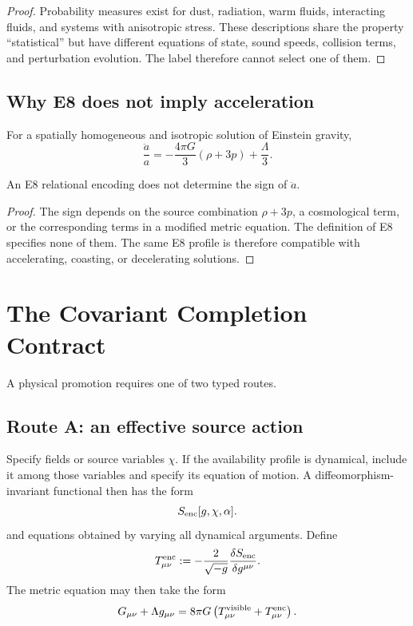 \documentclass[11pt]{article}
\begin{document}
\begin{proof}
Probability measures exist for dust, radiation, warm fluids, interacting
fluids, and systems with anisotropic stress.  These descriptions share the
property ``statistical'' but have different equations of state, sound speeds,
collision terms, and perturbation evolution.  The label therefore cannot
select one of them.
\end{proof}

\subsection{Why E8 does not imply acceleration}

For a spatially homogeneous and isotropic solution of Einstein gravity,
\[
\frac{\ddot a}{a}
=-\frac{4\pi G}{3}(\rho+3p)+\frac{\Lambda}{3}.
\]

\begin{proposition}
An E8 relational encoding does not determine the sign of $\ddot a$.
\end{proposition}

\begin{proof}
The sign depends on the source combination $\rho+3p$, a cosmological term, or
the corresponding terms in a modified metric equation.  The definition of E8
specifies none of them.  The same E8 profile is therefore compatible with
accelerating, coasting, or decelerating solutions.
\end{proof}

\section{The Covariant Completion Contract}

A physical promotion requires one of two typed routes.

\subsection{Route A: an effective source action}

Specify fields or source variables $\chi$.  If the availability profile is
dynamical, include it among those variables and specify its equation of
motion.  A diffeomorphism-invariant functional then has the form
\[
S_{\rm enc}[g,\chi,\alpha].
\]
and equations obtained by varying all dynamical arguments.  Define
\[
T_{\mu\nu}^{\rm enc}
:=-\frac{2}{\sqrt{-g}}
\frac{\delta S_{\rm enc}}{\delta g^{\mu\nu}}.
\]
The metric equation may then take the form
\[
G_{\mu\nu}+\Lambda g_{\mu\nu}
=8\pi G\left(T_{\mu\nu}^{\rm visible}
+T_{\mu\nu}^{\rm enc}\right).
\]
\end{document}
